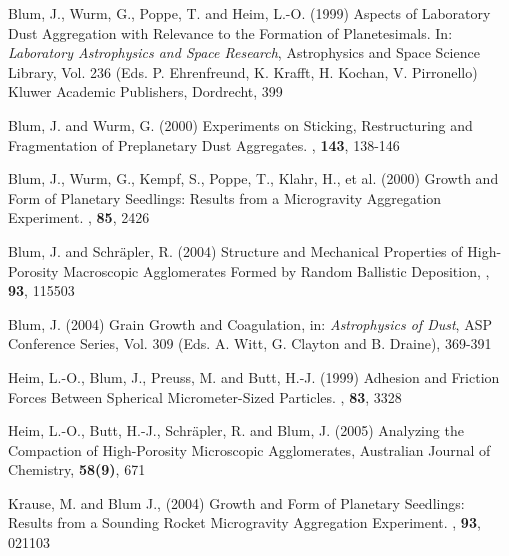 %
%
%
%
\begin{ownpubl}

\item Blum, J., Wurm, G., Poppe, T. and Heim, L.-O. (1999) Aspects
of Laboratory Dust Aggregation with Relevance to the Formation of
Planetesimals. In: \textit{Laboratory Astrophysics and Space
Research}, Astrophysics and Space Science Library, Vol. 236 (Eds.
P. Ehrenfreund, K. Krafft, H. Kochan, V. Pirronello) Kluwer
Academic Publishers, Dordrecht, 399

\item Blum, J. and Wurm, G. (2000) Experiments on Sticking,
Restructuring and Fragmentation of Preplanetary Dust Aggregates.
\ica, \textbf{143}, 138-146

\item Blum, J., Wurm, G., Kempf, S., Poppe, T., Klahr, H., et al.
(2000) Growth and Form of Planetary Seedlings: Results from a
Microgravity Aggregation Experiment. \prl, \textbf{85}, 2426

\item Blum, J. and Schr\"apler, R. (2004) Structure and Mechanical
Properties of High-Porosity Macroscopic Agglomerates Formed by
Random Ballistic Deposition, \prl, \textbf{93}, 115503

\item Blum, J. (2004) Grain Growth and Coagulation, in:
\textit{Astrophysics of Dust}, ASP Conference Series, Vol. 309
(Eds. A. Witt, G. Clayton and B. Draine), 369-391

\item Heim, L.-O., Blum, J., Preuss, M. and Butt, H.-J. (1999)
Adhesion and Friction Forces Between Spherical Micrometer-Sized
Particles. \prl, \textbf{83}, 3328

\item Heim, L.-O., Butt, H.-J., Schr\"apler, R. and Blum, J.
(2005) Analyzing the Compaction of High-Porosity Microscopic
Agglomerates, Australian Journal of Chemistry, \textbf{58(9)}, 671

\item Krause, M. and Blum J., (2004) Growth and Form of Planetary
Seedlings: Results from a Sounding Rocket Microgravity Aggregation
Experiment. \prl, \textbf{93}, 021103


\end{ownpubl}
